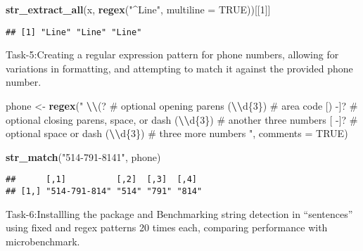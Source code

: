 \documentclass[
]{article}
\newenvironment{Shaded}{\begin{snugshade}}{\end{snugshade}}
\newcommand{\AttributeTok}[1]{\textcolor[rgb]{0.13,0.29,0.53}{#1}}
\newcommand{\ConstantTok}[1]{\textcolor[rgb]{0.56,0.35,0.01}{#1}}
\newcommand{\DecValTok}[1]{\textcolor[rgb]{0.00,0.00,0.81}{#1}}
\newcommand{\FunctionTok}[1]{\textcolor[rgb]{0.13,0.29,0.53}{\textbf{#1}}}
\newcommand{\NormalTok}[1]{#1}
\newcommand{\OtherTok}[1]{\textcolor[rgb]{0.56,0.35,0.01}{#1}}
\newcommand{\SpecialCharTok}[1]{\textcolor[rgb]{0.81,0.36,0.00}{\textbf{#1}}}
\newcommand{\StringTok}[1]{\textcolor[rgb]{0.31,0.60,0.02}{#1}}
\begin{document}
\begin{Shaded}
\begin{Highlighting}[]
\FunctionTok{str\_extract\_all}\NormalTok{(x, }\FunctionTok{regex}\NormalTok{(}\StringTok{"\^{}Line"}\NormalTok{, }\AttributeTok{multiline =} \ConstantTok{TRUE}\NormalTok{))[[}\DecValTok{1}\NormalTok{]]}
\end{Highlighting}
\end{Shaded}

\begin{verbatim}
## [1] "Line" "Line" "Line"
\end{verbatim}

Task-5:Creating a regular expression pattern for phone numbers, allowing
for variations in formatting, and attempting to match it against the
provided phone number.

\begin{Shaded}
\begin{Highlighting}[]
\NormalTok{phone }\OtherTok{\textless{}{-}} \FunctionTok{regex}\NormalTok{(}\StringTok{"}
\StringTok{  }\SpecialCharTok{\textbackslash{}\textbackslash{}}\StringTok{(?     \# optional opening parens}
\StringTok{  (}\SpecialCharTok{\textbackslash{}\textbackslash{}}\StringTok{d\{3\}) \# area code}
\StringTok{  [) {-}]?   \# optional closing parens, space, or dash}
\StringTok{  (}\SpecialCharTok{\textbackslash{}\textbackslash{}}\StringTok{d\{3\}) \# another three numbers}
\StringTok{  [ {-}]?    \# optional space or dash}
\StringTok{  (}\SpecialCharTok{\textbackslash{}\textbackslash{}}\StringTok{d\{3\}) \# three more numbers}
\StringTok{  "}\NormalTok{, }\AttributeTok{comments =} \ConstantTok{TRUE}\NormalTok{)}

\FunctionTok{str\_match}\NormalTok{(}\StringTok{"514{-}791{-}8141"}\NormalTok{, phone)}
\end{Highlighting}
\end{Shaded}

\begin{verbatim}
##      [,1]          [,2]  [,3]  [,4] 
## [1,] "514-791-814" "514" "791" "814"
\end{verbatim}

Task-6:Installling the package and Benchmarking string detection in
``sentences'' using fixed and regex patterns 20 times each, comparing
performance with microbenchmark.
\end{document}
